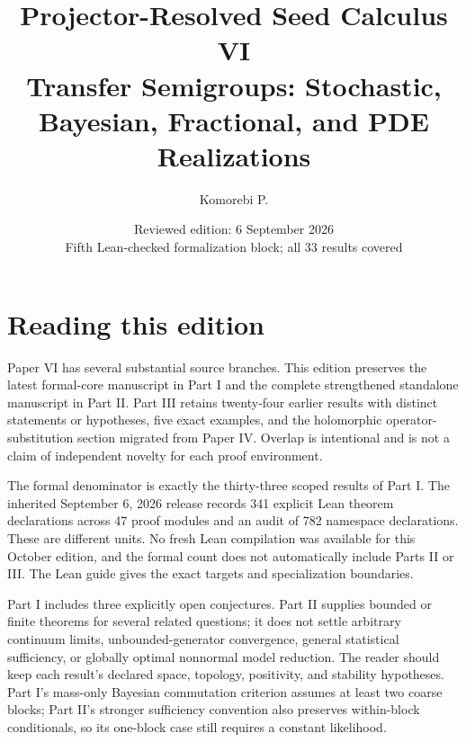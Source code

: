 \documentclass[11pt,a4paper]{article}
\title{\textbf{Projector-Resolved Seed Calculus VI}\\[0.45em]
\large Transfer Semigroups: Stochastic, Bayesian, Fractional, and PDE Realizations}
\author{Komorebi P.}
\date{Reviewed edition: 6 September 2026\\\small Fifth Lean-checked formalization block; all 33 results covered}
\theoremstyle{definition}
\theoremstyle{remark}
\begin{document}
\KomorebiCover
{}

\hypersetup{pageanchor=false}

\hypersetup{pageanchor=true}
\section*{Reading this edition}
Paper VI has several substantial source branches. This edition preserves the latest formal-core manuscript in Part I and the complete strengthened standalone manuscript in Part II. Part III retains twenty-four earlier results with distinct statements or hypotheses, five exact examples, and the holomorphic operator-substitution section migrated from Paper IV. Overlap is intentional and is not a claim of independent novelty for each proof environment.

The formal denominator is exactly the thirty-three scoped results of Part I. The inherited September 6, 2026 release records 341 explicit Lean theorem declarations across 47 proof modules and an audit of 782 namespace declarations. These are different units. No fresh Lean compilation was available for this October edition, and the formal count does not automatically include Parts II or III. The Lean guide gives the exact targets and specialization boundaries.

Part I includes three explicitly open conjectures. Part II supplies bounded or finite theorems for several related questions; it does not settle arbitrary continuum limits, unbounded-generator convergence, general statistical sufficiency, or globally optimal nonnormal model reduction. The reader should keep each result's declared space, topology, positivity, and stability hypotheses. Part I's mass-only Bayesian commutation criterion assumes at least two coarse blocks; Part II's stronger sufficiency convention also preserves within-block conditionals, so its one-block case still requires a constant likelihood.
\end{document}
